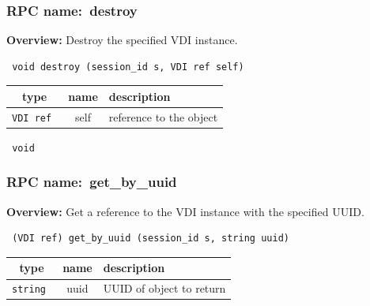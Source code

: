 \subsubsection{RPC name:~destroy}

{\bf Overview:} 
Destroy the specified VDI instance.

\begin{verbatim} void destroy (session_id s, VDI ref self)\end{verbatim}



 
\vspace{0.3cm}
\begin{tabular}{|c|c|p{7cm}|}
 \hline
{\bf type} & {\bf name} & {\bf description} \\ \hline
{\tt VDI ref } & self & reference to the object \\ \hline 

\end{tabular}

\vspace{0.3cm}

{\tt 
void
}



\vspace{0.3cm}
\vspace{0.3cm}
\vspace{0.3cm}
\subsubsection{RPC name:~get\_by\_uuid}

{\bf Overview:} 
Get a reference to the VDI instance with the specified UUID.

\begin{verbatim} (VDI ref) get_by_uuid (session_id s, string uuid)\end{verbatim}



 
\vspace{0.3cm}
\begin{tabular}{|c|c|p{7cm}|}
 \hline
{\bf type} & {\bf name} & {\bf description} \\ \hline
{\tt string } & uuid & UUID of object to return \\ \hline 

\end{tabular}

\vspace{0.3cm}

